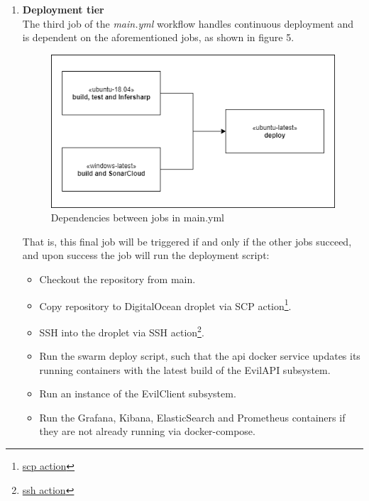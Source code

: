 \documentclass[report/main.tex]{subfiles}
\begin{document}
\begin{enumerate}
                    
                    \item \textbf{Deployment tier} \\
                    The third job of the \textit{main.yml} workflow handles continuous deployment and is dependent on the aforementioned jobs, as shown in figure 5. %
                    
                    \begin{figure}[H]
                    \centering
                        \includegraphics[width=\textwidth/2]{report/images/EvilTwitter-main-final.png}
                        \caption{Dependencies between jobs in main.yml}
                    \label{fig:main_workflow}
                    \end{figure}
                    
                    That is, this final job will be triggered if and only if the other jobs succeed, and upon success the job will run the deployment script:
                    
                    \begin{itemize}
                        \item Checkout the repository from main. 
                        \item Copy repository to DigitalOcean droplet via SCP action\footnote{\href{https://github.com/appleboy/scp-action}{scp action}}. 
                        \item SSH into the droplet via SSH action\footnote{\href{https://github.com/appleboy/ssh-action}{ssh action}}.
                        \item Run the swarm deploy script, such that the api docker service updates its running containers with the latest build of the EvilAPI subsystem. 
                        \item Run an instance of the EvilClient subsystem. 
                        \item Run the Grafana, Kibana, ElasticSearch and Prometheus containers if they are not already running via docker-compose.  
                    \end{itemize}
                    

\end{enumerate}
\end{document}
